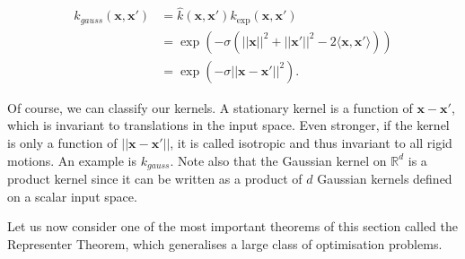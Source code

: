 \documentclass[12pt,a4paper,oneside]{book}
\begin{document}
\begin{align}
k_{gauss}(\bm{x},\bm{x}') &= \hat{k}(\bm{x},\bm{x}') k_{\exp} (\bm{x},\bm{x}') \nonumber \\
 &= \exp{(-\sigma(||\bm{x}||^2 + ||\bm{x}'||^2 - 2 \langle \bm{x},\bm{x}' \rangle ))}  \nonumber \\
&= \exp{(-\sigma ||\bm{x}-\bm{x}'||^2)}.
\end{align}

Of course, we can classify our kernels. A stationary kernel is a function of $\bm{x} - \bm{x}'$, which is invariant to translations in the input space. Even stronger, if the kernel is only a function of $||\bm{x} - \bm{x}'||$, it is called isotropic and thus invariant to all rigid motions. An example is $k_{gauss}$. Note also that the Gaussian kernel on $\mathbb{R}^d$ is a product kernel since it can be written as a product of $d$ Gaussian kernels defined on a scalar input space.




Let us now consider one of the most important theorems of this section called the Representer Theorem, which generalises a large class of optimisation problems. 
\end{document}
